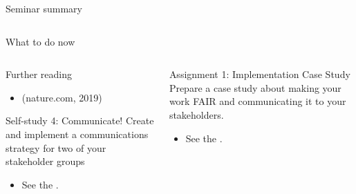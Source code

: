 \begin{frame}{Seminar summary}
\begin{columns}[c]
\begin{column}{.45\textwidth}
		\end{column}
		
	\end{columns}

\end{frame}


\begin{frame}{What to do now}

	\begin{columns}[t]
		\begin{column}{.45\textwidth}
		
		\begin{block}{Further reading}
		\begin{itemize}
		    \item {} (nature.com, 2019)
		\end{itemize}
		\end{block}
		
		\begin{block}{Self-study 4: Communicate!}
			Create and implement a communications strategy for two of your stakeholder groups
			\begin{itemize}
			    \item See the .
			\end{itemize}
		\end{block}
		\end{column}

		\begin{column}{.45\textwidth}
		
		\begin{block}{Assignment 1: Implementation Case Study}
			Prepare a case study about making your work FAIR and communicating it to your stakeholders.
			\begin{itemize}
			    \item See the .
			\end{itemize}
		\end{block}
		

\end{column}
\end{columns}
\end{frame}
